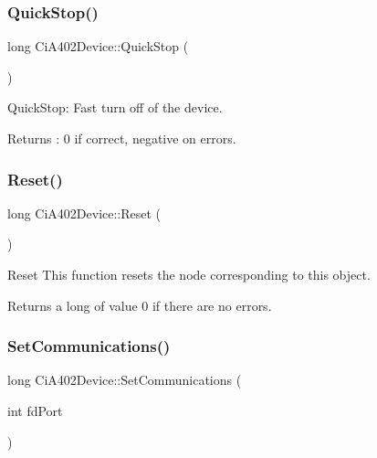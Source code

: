 \subsubsection{\texorpdfstring{Quick\+Stop()}{QuickStop()}}
{\footnotesize\ttfamily long Ci\+A402\+Device\+::\+Quick\+Stop (\begin{DoxyParamCaption}{ }\end{DoxyParamCaption})}



Quick\+Stop\+: Fast turn off of the device. 

\begin{DoxyReturn}{Returns}
\+: 0 if correct, negative on errors. 
\end{DoxyReturn}
\mbox{\label{classCiA402Device_ac4a6e4987ebe075d0ac07ee5fd4d410c}} 
\subsubsection{\texorpdfstring{Reset()}{Reset()}}
{\footnotesize\ttfamily long Ci\+A402\+Device\+::\+Reset (\begin{DoxyParamCaption}{ }\end{DoxyParamCaption})}



Reset This function resets the node corresponding to this object. 

\begin{DoxyReturn}{Returns}
a long of value 0 if there are no errors. 
\end{DoxyReturn}
\mbox{\label{classCiA402Device_abf511a7d44b62ac93ae18fe21f8d51c9}} 
\subsubsection{\texorpdfstring{Set\+Communications()}{SetCommunications()}}
{\footnotesize\ttfamily long Ci\+A402\+Device\+::\+Set\+Communications (\begin{DoxyParamCaption}\item[{int}]{fd\+Port }\end{DoxyParamCaption})}

